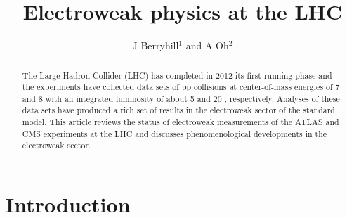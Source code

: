 \documentclass[12pt]{iopart}
\begin{document}
\title[Electroweak phyiscs at the LHC]{Electroweak physics at the LHC}
\author{J Berryhill$^1$ and A Oh$^2$}

\address{$^1$ Fermi National Accelerator Laboratory, Batavia, IL, USA}
\address{$^2$ School of Physics and Astronomy, University of Manchester, Manchester, UK}


\begin{abstract}
The Large Hadron Collider (LHC) has completed in 2012 its first
running phase and the experiments have collected data sets of pp
collisions at center-of-mass energies of 7 and 8 \TeV\xspace with an
integrated luminosity of about 5 \ifb and 20 \ifb, respectively.  Analyses
of these data sets have produced a rich set of results in the
electroweak sector of the standard model. This article reviews the
status of electroweak measurements of the ATLAS and CMS experiments at
the LHC and discusses phenomenological developments in the electroweak
sector.
\end{abstract}

%
%
\submitto{\jpg}
%
\maketitle
%
%


\section{Introduction}

%
\end{document}
